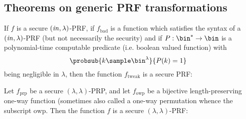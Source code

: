 \subsection{Theorems on generic PRF transformations}
\begin{theorem}\label{thm:PRF-negl-mod}
    If $f$ is a secure $(\mathit{in},\lambda)$-PRF, if $f_{\text{bad}}$ is a function which satisfies the
    syntax of a $(\mathit{in},\lambda)$-PRF
    (but not necessarily the security) and if $P:\bin^*\rightarrow\bin$ is a polynomial-time computable predicate (i.e. boolean valued function) with
    \[\probsub{k\sample\bin^\lambda}{P(k)=1}\]
    being negligible in $\lambda$, then the function $f_{\text{tweak}}$ is a secure PRF:
    \begin{center}
        \begin{pchstack}
        \end{pchstack}
    \end{center}
\end{theorem}

\begin{theorem}
    Let $f_{\text{prp}}$ be a secure $(\lambda,\lambda)$-PRP, and let $f_{\text{owp}}$ be a bijective length-preserving
    one-way function (sometimes also called a one-way permutation whence the subscript $\text{owp}$.
    Then the function $f$ is a secure $(\lambda,\lambda)$-PRF:
    \begin{center}
        \begin{pchstack}
        \end{pchstack}
    \end{center}
\end{theorem}
